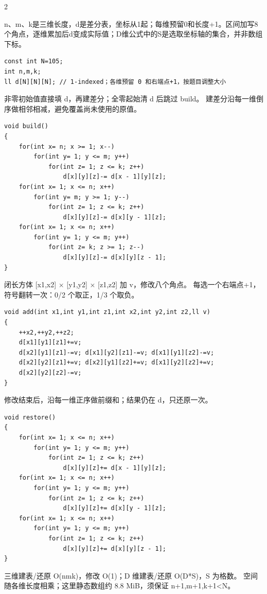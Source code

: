 \documentclass[UTF8,fontset=fandol,a4paper,twoside]{ctexart}
\newcommand{\note}[1]{{\fontsize{10}{12}\selectfont #1\par}}
\begin{document}
\begin{multicols}{2}
\note{n、m、k是三维长度，d是差分表，坐标从1起；每维预留0和长度+\allowbreak{}1。区间加写8个角点，逐维累加后d变成实际值；D维公式中的S是选取坐标轴的集合，并非数组下标。}
\begin{lstlisting}
const int N=105;
int n,m,k;
ll d[N][N][N]; // 1-indexed；各维预留 0 和右端点+1，按题目调整大小
\end{lstlisting}
\note{非零初始值直接填 d，再建差分；全零起始清 d 后跳过 build。 建差分沿每一维倒序做相邻相减，避免覆盖尚未使用的原值。}
\begin{lstlisting}
void build()
{
    for(int x= n; x >= 1; x--)
        for(int y= 1; y <= m; y++)
            for(int z= 1; z <= k; z++)
                d[x][y][z]-= d[x - 1][y][z];
    for(int x= 1; x <= n; x++)
        for(int y= m; y >= 1; y--)
            for(int z= 1; z <= k; z++)
                d[x][y][z]-= d[x][y - 1][z];
    for(int x= 1; x <= n; x++)
        for(int y= 1; y <= m; y++)
            for(int z= k; z >= 1; z--)
                d[x][y][z]-= d[x][y][z - 1];
}
\end{lstlisting}
\note{闭长方体 [\allowbreak{}x1,\allowbreak{}x2]\allowbreak{} \ensuremath{\times} [\allowbreak{}y1,\allowbreak{}y2]\allowbreak{} \ensuremath{\times} [\allowbreak{}z1,\allowbreak{}z2]\allowbreak{} 加 v，修改八个角点。 每选一个右端点+\allowbreak{}1，符号翻转一次：0/\allowbreak{}2 个取正，1/\allowbreak{}3 个取负。}
\begin{lstlisting}
void add(int x1,int y1,int z1,int x2,int y2,int z2,ll v)
{
    ++x2,++y2,++z2;
    d[x1][y1][z1]+=v;
    d[x2][y1][z1]-=v; d[x1][y2][z1]-=v; d[x1][y1][z2]-=v;
    d[x2][y2][z1]+=v; d[x2][y1][z2]+=v; d[x1][y2][z2]+=v;
    d[x2][y2][z2]-=v;
}
\end{lstlisting}
\note{修改结束后，沿每一维正序做前缀和；结果仍在 d，只还原一次。}
\begin{lstlisting}
void restore()
{
    for(int x= 1; x <= n; x++)
        for(int y= 1; y <= m; y++)
            for(int z= 1; z <= k; z++)
                d[x][y][z]+= d[x - 1][y][z];
    for(int x= 1; x <= n; x++)
        for(int y= 1; y <= m; y++)
            for(int z= 1; z <= k; z++)
                d[x][y][z]+= d[x][y - 1][z];
    for(int x= 1; x <= n; x++)
        for(int y= 1; y <= m; y++)
            for(int z= 1; z <= k; z++)
                d[x][y][z]+= d[x][y][z - 1];
}
\end{lstlisting}
\note{三维建表/\allowbreak{}还原 O(\allowbreak{}nmk)\allowbreak{}，修改 O(\allowbreak{}1)\allowbreak{}；D 维建表/\allowbreak{}还原 O(\allowbreak{}D*S)\allowbreak{}，S 为格数。 空间随各维长度相乘；这里静态数组约 8.\allowbreak{}8 MiB，须保证 n+\allowbreak{}1,\allowbreak{}m+\allowbreak{}1,\allowbreak{}k+\allowbreak{}1<\allowbreak{}N。}

\end{multicols}
\end{document}
